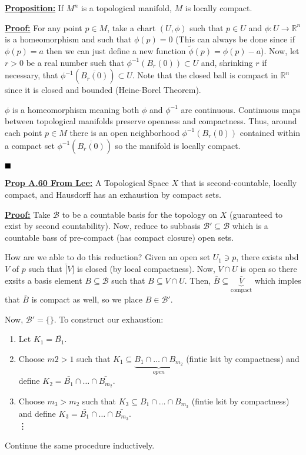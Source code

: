 \documentclass{article}
\newcommand{\qedsymbol}{\hfill\blacksquare}
\begin{document}
\vskip 1cm
\underline{\textbf{Proposition:}} If $M^n$ is a topological manifold, $M$ is locally compact.

\vskip 0.5cm
\underline{\textbf{Proof:}} For any point $p \in M$, take a chart $(U, \phi)$ such that $p \in U$ and $\phi : U \rightarrow \mathbb{R}^n$ is a homeomorphism and such that $\phi(p) = 0$ (This can always be done since if $\phi(p) = a$ then we can just define a new function $\tilde{\phi}(p) = \phi(p) - a$). Now, let $r > 0$ be a real number such that $\phi^{-1}(B_r (0)) \subset U$ and, shrinking $r$ if necessary, that $\phi^{-1}(\overline{B_r (0)}) \subset U$. Note that the closed ball is compact in $\mathbb{R}^n$ since it is closed and bounded (Heine-Borel Theorem). 

\vskip 0.5cm
$\phi$ is a homeomorphism meaning both $\phi$ and $\phi^{-1}$ are continuous. Continuous maps between topological manifolds preserve openness and compactness. Thus, around each point $p \in M$ there is an open neighborhood $\phi^{-1}(B_r(0))$ contained within a compact set $\phi^{-1}(\overline{B_r(0)})$ so the manifold is locally compact.

$\qedsymbol$

\vskip 0.5cm
\underline{\textbf{Prop A.60 From Lee:}} A Topological Space $X$ that is second-countable, locally compact, and Hausdorff has an exhaustion by compact sets.

\vskip 0.5cm
\underline{\textbf{Proof:}} Take $\mathcal B$ to be a countable basis for the topology on $X$ (guaranteed to exist by second countability). Now, reduce to subbasis $\mathcal{B}' \subseteq \mathcal{B}$ which is a countable bass of pre-compact (has compact closure) open sets. 

\vskip 0.5cm
How are we able to do this reduction? Given an open set $U_1 \ni p$, there exists nbd $V$ of $p$ such that $\bar[V]$ is closed (by local compactness). Now, $V \cap U$ is open so there exsits a basis element $B \subseteq \mathcal B$ such that $B \subseteq V \cap U$. Then, $\bar{B} \subseteq \underbrace{\bar{V}}_{\text{compact}}$ which imples that $\bar{B}$ is compact as well, so we place $B \in \mathcal{B}'$.

\vskip 0.5cm
Now, $\mathcal{B}' = \{\}$. To construct our exhaustion:
\begin{enumerate}
  \item Let $K_1 = \bar{B_1}$.
  \item Choose $m2 > 1$ such that $K_1 \subseteq \underbrace{B_1 \cap \dots \cap B_{m_2}}_{open}$ (fintie lsit by compactness) and define $K_2 = \bar{B_1} \cap \dots \cap \bar{B_{m_2}}$.
  \item Choose $m_3 > m_2$ such that $K_3 \subseteq B_1 \cap \dots \cap B_{m_3}$ (fintie lsit by compactness) and define $K_3 = \bar{B_1} \cap \dots \cap \bar{B_{m_3}}$. \\
  \vdots
\end{enumerate}
Continue the same procedure inductively.
\end{document}
